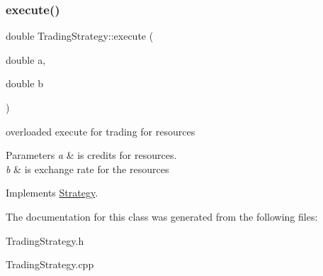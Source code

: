 \subsubsection{\texorpdfstring{execute()}{execute()}}
{\footnotesize\ttfamily double Trading\+Strategy\+::execute (\begin{DoxyParamCaption}\item[{double}]{a,  }\item[{double}]{b }\end{DoxyParamCaption})\hspace{0.3cm}{\ttfamily [virtual]}}

overloaded execute for trading for resources 
\begin{DoxyParams}{Parameters}
{\em a} & is credits for resources. \\
\hline
{\em b} & is exchange rate for the resources \\
\hline
\end{DoxyParams}


Implements \hyperlink{classStrategy_a81b8d4f53494c438b21fc999c7ea59f4}{Strategy}.



The documentation for this class was generated from the following files\+:\begin{DoxyCompactItemize}
\item 
Trading\+Strategy.\+h\item 
Trading\+Strategy.\+cpp\end{DoxyCompactItemize}
